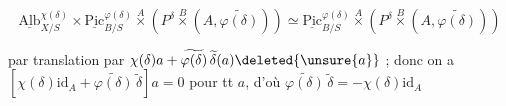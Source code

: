 \[
\underline{\mathrm{Alb}}_{X/S}^{\chi(\delta)}\times\underline{\mathrm{Pic}}^{\varphi(\delta)}_{B/S}
\overset A\times (P^\delta\overset B\times(A,\widetilde{\varphi(\delta)}))
\simeq\underline{\mathrm{Pic}}^{\varphi(\delta)}_{B/S}\overset A\times
(P^\delta\overset B\times(A,\widetilde{\varphi(\delta)}))
\]


par translation par $\chi(\delta)a+\widetilde{\varphi(\delta)}\,\widetilde\delta(a)\deleted{\unsure{a}}$ ; donc on a $[\chi(\delta)\mathrm{id}_A+\widetilde{\varphi(\delta)}\,\widetilde\delta]a=0$ pour tt $a$, d'où  $\widetilde{\varphi(\delta)}\,\widetilde\delta=-\chi(\delta)\mathrm{id}_A$
